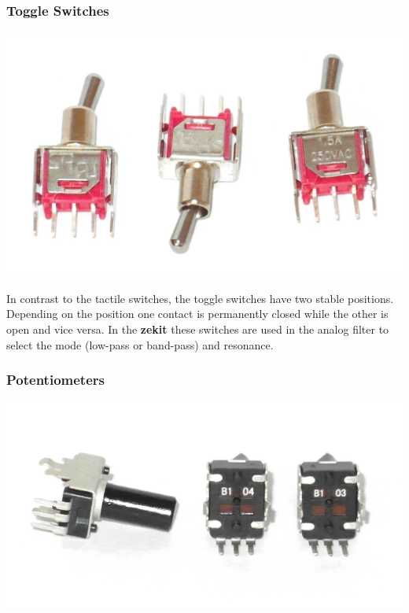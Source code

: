 \documentclass{scrartcl}
\begin{document}
\subsubsection{Toggle Switches}

\begin{center}
    \includegraphics[scale=0.15]{assets/zekit-toggles.jpg}
\end{center}

In contrast to the tactile switches, the toggle switches have two stable positions. Depending on the position one contact is permanently closed while the other is open and vice versa. In the \textbf{zekit} these switches are used in the analog filter to select the mode (low-pass or band-pass) and resonance.

\subsubsection{Potentiometers}

\begin{center}
    \includegraphics[scale=0.20]{assets/zekit-pots.jpg}
\end{center}
\end{document}
